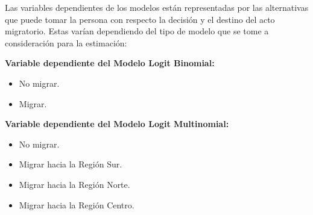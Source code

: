 \documentclass[12pt,a4paper]{article}
\begin{document}
Las variables dependientes de los modelos están representadas por las alternativas que puede tomar la persona con respecto la decisión y el destino del acto migratorio. Estas varían dependiendo del tipo de modelo que se tome a consideración para la estimación:

\textbf{Variable dependiente del Modelo Logit Binomial:}
\begin{itemize}
\item No migrar.
\item Migrar.
\end{itemize}

\textbf{Variable dependiente del Modelo Logit Multinomial:}
\begin{itemize}
\item No migrar.
\item Migrar hacia la Región Sur.
\item Migrar hacia la Región Norte.
\item Migrar hacia la Región Centro.
\end{itemize}
\end{document}
